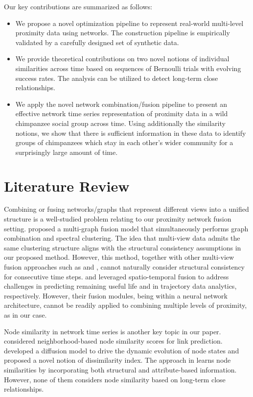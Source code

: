 \documentclass{article}
\theoremstyle{plain}
\theoremstyle{definition}
\theoremstyle{remark}
\begin{document}
Our key contributions are summarized as follows:
\begin{itemize}[noitemsep, nolistsep, leftmargin=*]
    \item We propose a novel optimization pipeline to represent real-world multi-level proximity data using networks. The construction pipeline is empirically validated by a carefully designed set of synthetic data.
    \item We provide theoretical contributions on two novel notions of individual similarities across time based on sequences of Bernoulli trials with evolving success rates. The analysis can be utilized to detect long-term close relationships.
    \item We apply the novel network combination/fusion pipeline to present an effective network time series representation of proximity data in a wild chimpanzee social group across time. Using additionally the similarity notions, we show that there is sufficient information in these data to identify groups of chimpanzees which stay in each other's wider community for a surprisingly large amount of time. 
\end{itemize}
\section{Literature Review}

Combining or fusing networks/graphs that represent different views into a unified structure is a well-studied problem relating to our proximity network fusion setting. \citet{kang2020multi} proposed a multi-graph fusion model that simultaneously performs graph combination and spectral clustering. The idea that multi-view data admits the same clustering structure aligns with the structural consistency assumptions in our proposed method. However, this method, together with other multi-view fusion approaches such as \citet{yang2019adaptive} and \citet{yang2024bidirectional}, cannot naturally consider structural consistency for consecutive time steps. \citet{zhang2021adaptive} and \citet{hu2022spatio} leveraged spatio-temporal fusion to address challenges in predicting remaining useful life and in trajectory data analytics, respectively. However, their fusion modules, being within a neural network architecture, cannot be readily applied to combining multiple levels of proximity, as in our case.

Node similarity in network time series is another key topic in our paper. \citet{gunecs2016link} considered neighborhood-based node similarity scores for link prediction. \citet{yang2019time} developed a diffusion model to drive the dynamic evolution of node states and proposed a novel notion of dissimilarity index. The approach in \citet{meng2018coupled} learns node similarities by incorporating both structural and attribute-based information. However, none of them considers node similarity based on long-term close relationships.
\end{document}
